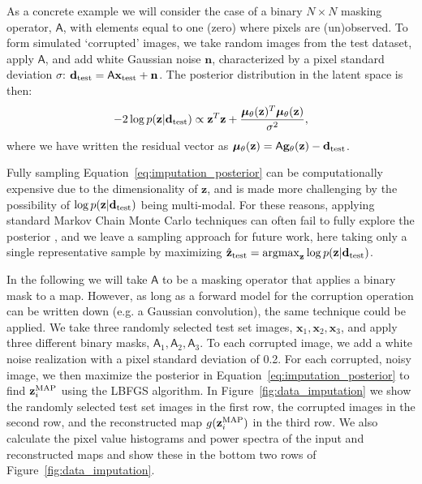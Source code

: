 \documentclass[fleqn,usenatbib]{mnras}
\DeclareMathOperator*{\argmax}{argmax}
\begin{document}
As a concrete example we will consider the case of a binary $N\times N$ masking operator, $\mathsf A$, with elements equal to one (zero) where pixels are (un)observed. To form simulated `corrupted' images, we take random images from the test dataset, apply $\mathsf A$, and add white Gaussian noise $\mathbf n$, characterized by a pixel standard deviation $\sigma$: $\mathbf d_{\rm test} = \mathsf A \mathbf x_{\rm test} + \mathbf n$. The posterior distribution in the latent space is then:
\begin{equation}
\label{eq:imputation_posterior}
  - 2 \log p(\mathbf z | \mathbf d_{\rm test}) \propto \mathbf z^T \mathbf z + \frac{\bm \mu_\theta(\mathbf z)^T \bm \mu_\theta(\mathbf z)}{\sigma^2},
\end{equation}
where we have written the residual vector as $\bm \mu_\theta(\mathbf z) = \mathsf A \mathbf g_\theta(\mathbf z) - \mathbf d_{\rm test}$.

Fully sampling Equation~\ref{eq:imputation_posterior} can be computationally expensive due to the dimensionality of $\mathbf z$, and is made more challenging by the possibility of $\log p(\mathbf z| \mathbf d_{\rm test})$ being multi-modal. For these reasons, applying standard Markov Chain Monte Carlo techniques can often fail to fully explore the posterior \citep{bohm/seljak:2019}, and we leave a sampling approach for future work, here taking only a single representative sample by maximizing $\hat{\mathbf{z}}_{\rm test} = \argmax_{\mathbf z} \log p(\mathbf z | \mathbf d_{\rm test})$. 

In the following we will take $\mathsf A$ to be a masking operator that applies a binary mask to a map. However, as long as a forward model for the corruption operation can be written down (e.g. a Gaussian convolution), the same technique could be applied. We take three randomly selected test set images, $\mathbf x_1, \mathbf x_2, \mathbf x_3$, and apply three different binary masks, $\mathsf A_1, \mathsf A_2, \mathsf A_3$. To each corrupted image, we add a white noise realization with a pixel standard deviation of 0.2. For each corrupted, noisy image, we then maximize the posterior in Equation~\ref{eq:imputation_posterior} to find $\mathbf z_i^{\rm MAP}$ using the LBFGS algorithm. In Figure~\ref{fig:data_imputation} we show the randomly selected test set images in the first row, the corrupted images in the second row, and the reconstructed map $g(\mathbf z_i^{\rm MAP})$ in the third row. We also calculate the pixel value histograms and power spectra of the input and reconstructed maps and show these in the bottom two rows of Figure~\ref{fig:data_imputation}.
\end{document}
